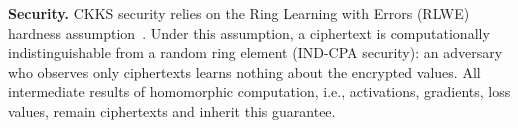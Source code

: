 \textbf{Security.} CKKS security relies on the Ring Learning with Errors (RLWE) hardness assumption~\cite{lyubashevsky2010ideal}. Under this assumption, a ciphertext is computationally indistinguishable from a random ring element (IND-CPA security): an adversary who observes only ciphertexts learns nothing about the encrypted values. All intermediate results of homomorphic computation, i.e., activations, gradients, loss values, remain ciphertexts and inherit this guarantee.








